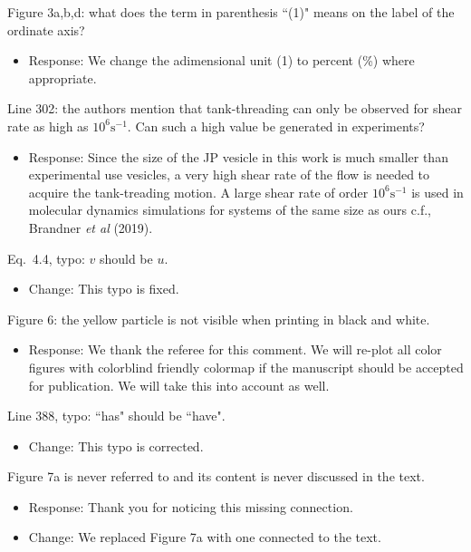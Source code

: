 \documentclass[11pt]{article}
\newcommand{\comment}[1]{{\color{blue} #1}}
\begin{document}
\noindent
\comment{Figure 3a,b,d: what does the term in parenthesis ``(1)" means
on the label of the ordinate axis?}
\begin{itemize}
  \item Response: We change the adimensional unit (1) to percent (\%) where appropriate. 
\end{itemize}

\noindent
\comment{Line 302: the authors mention that tank-threading can only be
observed for shear rate as high as $10^{6}\text{s}^{-1}$. Can such a
high value be generated in experiments?}
\begin{itemize}
\item Response:
Since the size of the JP vesicle in this work is much smaller than experimental use vesicles, 
a very high shear rate of the flow is needed to acquire the tank-treading motion.
A large shear rate of order $10^{6}\text{s}^{-1}$ is used in molecular dynamics
simulations for systems of the same size as ours c.f., Brandner {\it et al} (2019).
\end{itemize}

\noindent
\comment{Eq.~4.4, typo: $v$ should be $u$.}
\begin{itemize}
  \item Change: This typo is fixed.
\end{itemize}

\noindent
\comment{Figure 6: the yellow particle is not visible when printing in
black and white.}
\begin{itemize}
  \item Response: We thank the referee for this comment. We will re-plot all color figures with colorblind friendly colormap if the manuscript should be accepted for publication. We will take this into account as well.
\end{itemize}

\noindent
\comment{Line 388, typo: ``has" should be ``have".}
\begin{itemize}
  \item Change: This typo is corrected.
\end{itemize}

\noindent
\comment{Figure 7a is never referred to and its content is never
discussed in the text.}
\begin{itemize}
  \item Response: Thank you for noticing this missing connection. 
  \item Change: We replaced Figure 7a with one connected to the text.
\end{itemize}
\end{document}
